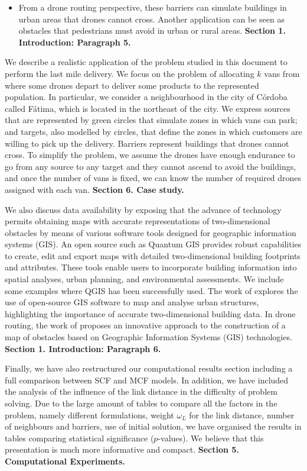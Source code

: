 \documentclass{article}
\newenvironment{reviewer}{\setcounter{pointcounter}{1}}{}
\newcommand{\point}{\text{{\selectfont \thepointcounter} \stepcounter{pointcounter}}}
\newcommand{\JP}[1]{{\color{black}#1}}
\begin{document}
\begin{reviewer}
\begin{tcolorbox}[breakable,enhanced,coltitle=black,colback=red!5!white,colframe=red!75!black,title=\textbf{Answer R1.\point},borderline={1pt}{0pt}{black},boxrule=0pt]
\begin{itemize}
				\item From a drone routing perspective, these barriers can simulate buildings in urban areas that drones cannot cross. Another application can be seen as obstacles that pedestrians must avoid in urban or rural areas. \textbf{Section 1. Introduction: Paragraph 5.}
			\end{itemize}
			We describe a realistic application of the problem studied in this document to perform the last mile delivery. We focus on the problem of allocating $k$ vans from where some drones depart to deliver some products to the represented population. In particular, we consider a neighbourhood in the city of Córdoba called Fátima, which is located in the northeast of the city. We express sources that are represented by green circles that simulate zones in which vans can park; and targets, also modelled by circles,  that define the zones in which customers are willing to pick up the delivery. Barriers represent buildings that drones cannot cross. To simplify the problem, we assume the drones have enough endurance to go from any source to any target and they cannot ascend to avoid the buildings, and once the number of vans is fixed, we can know the number of required drones assigned with each van. \textbf{Section 6. Case study. }
			
			We also discuss data availability by exposing that the advance of technology permits obtaining maps with accurate representations of two-dimensional obstacles by means of various software tools designed for geographic information systems (GIS). An open source such as Quantum GIS \citep{qgisdevelopmentteam2009} provides robust capabilities to create, edit and export maps with detailed two-dimensional building footprints and attributes. These tools enable users to incorporate building information into spatial analyses, urban planning, and environmental assessments. We include some examples where QGIS has been successfully used. The work of \cite{arsanjani2013} explores the use of open-source GIS software to map and analyse urban structures, highlighting the importance of accurate two-dimensional building data. In drone routing, the work of \cite{mangiameli2013} proposes an innovative approach to the construction of a map of obstacles based on Geographic Information Systems (GIS) technologies. \textbf{Section 1. Introduction: Paragraph 6.}

			\JP{Finally, we have also restructured our computational results section including a full comparison between SCF and MCF models. In addition, we have included the analysis of the influence of the link distance in the difficulty of problem solving. Due to the large amount of tables to compare all the factors in the problem, namely different formulations, weight $\omega_L$ for the link distance, number of neighbours and barriers, use of initial solution, we have organised the results in tables comparing statistical significance ($p$-values). We believe that this presentation is much more informative and compact. \textbf{Section 5. Computational Experiments.}}	


\end{tcolorbox}
\end{reviewer}
\end{document}

